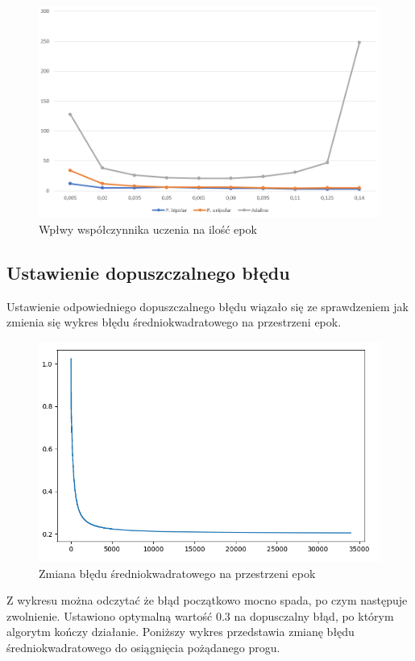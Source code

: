 \documentclass{article}
\begin{document}
\begin{figure}[h]
  \centering
  \includegraphics[width=\linewidth]{learnRate.png}
  \caption{Wpłwy współczynnika uczenia na ilość epok}
\end{figure}

\newpage
\subsection{ Ustawienie dopuszczalnego błędu }

Ustawienie odpowiedniego dopuszczalnego błędu wiązało się ze sprawdzeniem jak zmienia się wykres
błędu średniokwadratowego na przestrzeni epok.

\begin{figure}[h]
  \centering
  \includegraphics[width=\linewidth]{1000epochs.png}
  \caption{Zmiana błędu średniokwadratowego na przestrzeni epok}
\end{figure}

Z wykresu można odczytać że błąd początkowo mocno spada, po czym następuje zwolnienie. Ustawiono
optymalną wartość $0.3$ na dopusczalny błąd, po którym algorytm kończy działanie. Poniższy wykres przedstawia
zmianę błędu średniokwadratowego do osiągnięcia pożądanego progu. 
\end{document}
